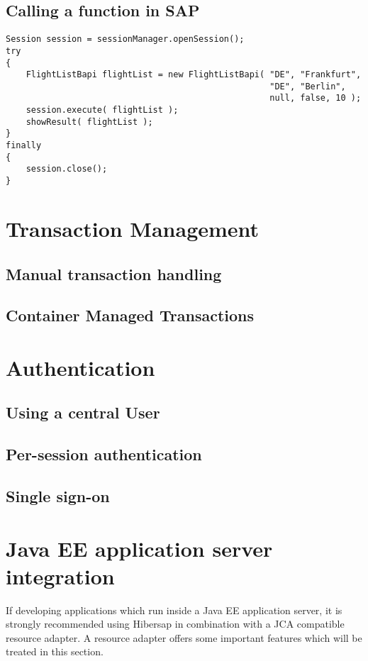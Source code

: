 \subsection{Calling a function in SAP}

\begin{Verbatim}[frame=single,label=Executing the function]
Session session = sessionManager.openSession();
try
{
    FlightListBapi flightList = new FlightListBapi( "DE", "Frankfurt", 
                                                    "DE", "Berlin", 
                                                    null, false, 10 );
    session.execute( flightList );
    showResult( flightList );
}
finally
{
    session.close();
}
\end{Verbatim}


\section{Transaction Management} 

\subsection{Manual transaction handling}

\subsection{Container Managed Transactions}


\section{Authentication}

\subsection{Using a central User}

\subsection{Per-session authentication}

\subsection{Single sign-on}


\section{Java EE application server integration}
If developing applications which run inside a Java EE application server, it is strongly recommended using Hibersap in combination with a JCA compatible resource adapter. A resource adapter offers some important features which will be treated in this section.

